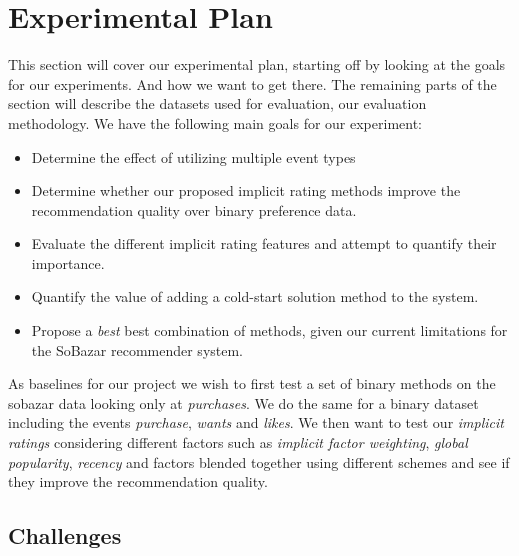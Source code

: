 \clearpage
\section{Experimental Plan}


This section will cover our experimental plan, starting off by looking at the
goals for our experiments. And how we want to get there. The remaining parts of
the section will describe the datasets used for evaluation, our evaluation methodology.
We have the following main goals for our experiment:

\begin{itemize}
	\item Determine the effect of utilizing multiple event types
	\item Determine whether our proposed implicit rating methods improve the recommendation quality over
	binary preference data.
	\item Evaluate the different implicit rating features and attempt to quantify their importance.
	\item Quantify the value of adding a cold-start solution method to the system.
	\item Propose a \emph{best} best combination of methods, given our current limitations for the SoBazar recommender system.
\end{itemize}

As baselines for our project we wish to first test a set of binary methods on the sobazar data
looking only at \emph{purchases}. We do the same for a binary dataset including the events
\emph{purchase}, \emph{wants} and \emph{likes}. We then want to test our \emph{implicit ratings}
considering different factors such as \emph{implicit factor weighting}, \emph{global popularity},
\emph{recency} and factors blended together using different schemes and see if they improve the
recommendation quality.

\subsection{Challenges}

